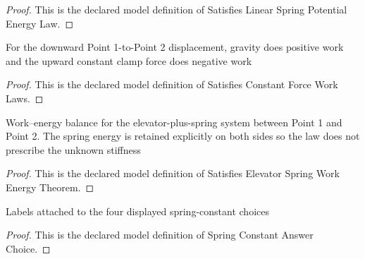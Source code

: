 \begin{proof}
  This is the declared model definition of Satisfies Linear Spring Potential Energy Law.
\end{proof}
\begin{definition}
  \label{def:physics:phyx-mini-0814:phyxminiproblems-problemphyxmini0814-satisfiesconstantforceworklaws}
  For the downward Point 1-to-Point 2 displacement, gravity does positive work and the upward constant clamp force does negative work
\end{definition}
\begin{proof}
  This is the declared model definition of Satisfies Constant Force Work Laws.
\end{proof}
\begin{definition}
  \label{def:physics:phyx-mini-0814:phyxminiproblems-problemphyxmini0814-satisfieselevatorspringworkenergytheorem}
  Work--energy balance for the elevator-plus-spring system between Point 1 and Point 2. The spring energy is retained explicitly on both sides so the law does not prescribe the unknown stiffness
\end{definition}
\begin{proof}
  This is the declared model definition of Satisfies Elevator Spring Work Energy Theorem.
\end{proof}
\begin{definition}
  \label{def:physics:phyx-mini-0814:phyxminiproblems-problemphyxmini0814-springconstantanswerchoice}
  Labels attached to the four displayed spring-constant choices
\end{definition}
\begin{proof}
  This is the declared model definition of Spring Constant Answer Choice.
\end{proof}
